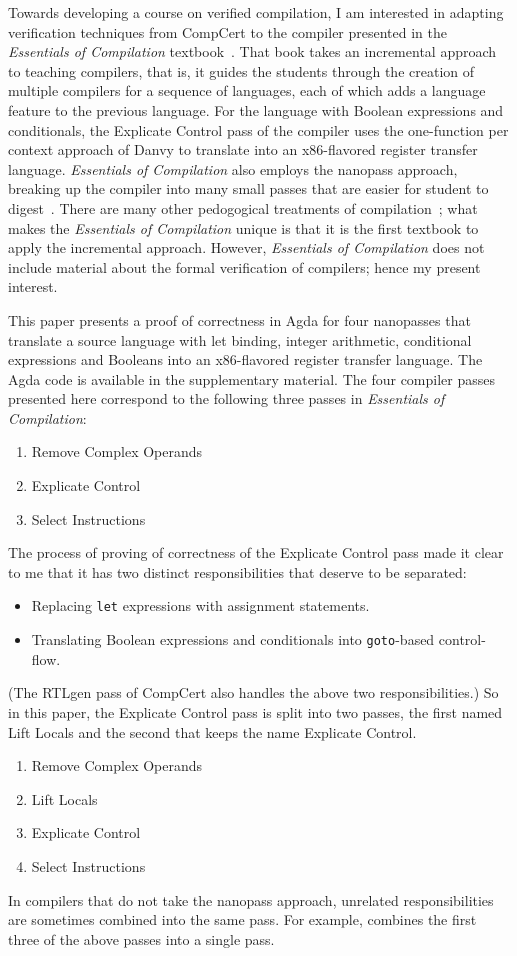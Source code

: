 \documentclass[sigplan,review,dvipsnames,screen,10pt]{acmart}
\begin{document}
Towards developing a course on verified compilation, I am interested
in adapting verification techniques from CompCert to the compiler
presented in the \emph{Essentials of Compilation}
textbook~\citep{Siek:2023tr,Siek:2023ue}. That book takes an
incremental approach to teaching compilers, that is, it guides the
students through the creation of multiple compilers for a sequence of
languages, each of which adds a language feature to the previous
language. For the language with Boolean expressions and conditionals,
the Explicate Control pass of the compiler uses the one-function per
context approach of Danvy to translate into an x86-flavored register
transfer language.  \emph{Essentials of Compilation} also employs the
nanopass approach, breaking up the compiler into many small passes
that are easier for student to digest~\citep{Sarkar:2004fk}.  There
are many other pedogogical treatments of
compilation~\citep{Appel:2003fk,Sumii:2005aa,Aho:2006wb,Cooper:2011aa,Grune:2012aa};
what makes the \emph{Essentials of Compilation} unique is that it is
the first textbook to apply the incremental approach.  However,
\emph{Essentials of Compilation} does not include material about the
formal verification of compilers; hence my present interest.

This paper presents a proof of correctness in Agda for four nanopasses
that translate a source language with let binding, integer arithmetic,
conditional expressions and Booleans into an x86-flavored register
transfer language. The Agda code is available in the supplementary
material. The four compiler passes presented here correspond to the
following three passes in \emph{Essentials of Compilation}:
\begin{enumerate}
\item Remove Complex Operands
\item Explicate Control
\item Select Instructions
\end{enumerate}
The process of proving of correctness of the Explicate Control pass
made it clear to me that it has two distinct responsibilities that
deserve to be separated:
\begin{itemize}
\item Replacing \texttt{let} expressions with assignment statements.
\item Translating Boolean expressions and conditionals into
  \texttt{goto}-based control-flow.
\end{itemize}
(The RTLgen pass of CompCert also handles the above two
responsibilities.)  So in this paper, the Explicate Control pass is
split into two passes, the first named Lift Locals and the second that
keeps the name Explicate Control.
\begin{enumerate}
\item Remove Complex Operands
\item Lift Locals
\item Explicate Control
\item Select Instructions
\end{enumerate}
In compilers that do not take the nanopass approach, unrelated
responsibilities are sometimes combined into the same pass.  For
example, \citet{Sumii:2005aa} combines the first three of the above
passes into a single pass.
\end{document}
